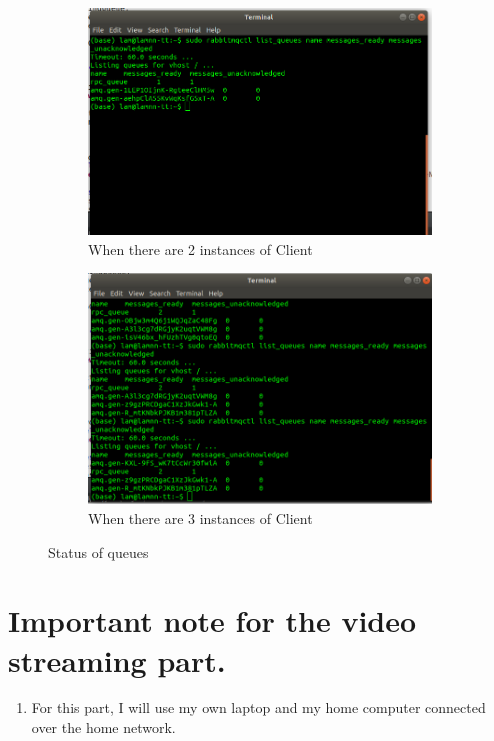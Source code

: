 \documentclass[11pt,a4paper]{report}
\begin{document}
	\begin{figure}[h!]
		\centering
  		\begin{subfigure}[b]{0.4\linewidth}
  		\includegraphics[width=\linewidth]{res-status.png}
    		\caption{When there are 2 instances of Client}
  		\end{subfigure}
  		\begin{subfigure}[b]{0.4\linewidth}
    		\includegraphics[width=\linewidth]{res-status-3.png}
    		\caption{When there are 3 instances of Client}
  		\end{subfigure}
  		\caption{Status of queues}
  		\label{fig:status}
	\end{figure}
	
	\section{Important note for the video streaming part.}
	\begin{enumerate}
		\item For this part, I will use my own laptop and my home computer connected over the home network.
	\end{enumerate}
	
\end{document}
